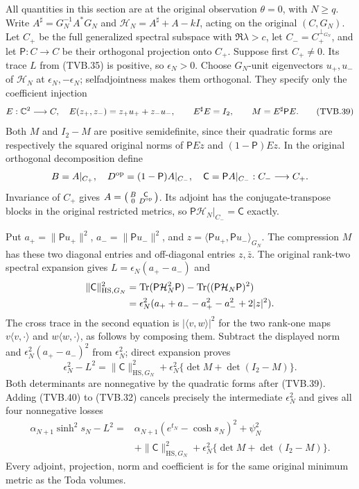 All quantities in this section are at the original observation
$\theta=0$, with $N\ge q$. Write
$A^\sharp=G_N^{-1}A^*G_N$ and
$\mathcal H_N=A^\sharp+A-kI$, acting on the original $(C,G_N)$.
Let $C_+$ be the full generalized spectral subspace with
$\Re\lambda>c$, let $C_-=C_+^{\perp_{G_N}}$, and let
$\mathsf P:C\to C$ be their orthogonal projection onto $C_+$.
Suppose first $C_+\ne0$. Its trace $L$ from (TVB.35) is positive,
so $\epsilon_N>0$. Choose $G_N$-unit eigenvectors $u_+,u_-$
of $\mathcal H_N$ at $\epsilon_N,-\epsilon_N$; selfadjointness
makes them orthogonal. They specify only the coefficient injection
\[
 E:\mathbb C^2\longrightarrow C,\quad E(z_+,z_-)=z_+u_++z_-u_-,
 \qquad E^\sharp E=I_2,\qquad M=E^\sharp\mathsf P E.
 \tag{TVB.39}
\]
Both $M$ and $I_2-M$ are positive semidefinite, since their
quadratic forms are respectively the squared original norms of
$\mathsf PEz$ and $(1-\mathsf P)Ez$.
In the original orthogonal decomposition define
\[
 B=A|_{C_+},\quad D^{\rm op}=(1-\mathsf P)A|_{C_-},\quad
 \mathsf C=\mathsf PA|_{C_-}:C_-\longrightarrow C_+.
\]
Invariance of $C_+$ gives
$A=\left(\begin{smallmatrix}B&\mathsf C\\0&D^{\rm op}\end{smallmatrix}\right)$.
Its adjoint has the conjugate-transpose blocks in the original
restricted metrics, so
$\mathsf P\mathcal H_N|_{C_-}=\mathsf C$ exactly.

Put $a_+=\|\mathsf Pu_+\|^2$, $a_-=\|\mathsf Pu_-\|^2$,
and $z=\langle\mathsf Pu_+,\mathsf Pu_-\rangle_{G_N}$.
The compression $M$ has these two diagonal entries and off-diagonal
entries $z,\bar z$. The original rank-two spectral expansion gives
$L=\epsilon_N(a_+-a_-)$ and
\[
 \begin{split}
 \|\mathsf C\|_{\mathrm{HS},G_N}^2
 &=\operatorname{Tr}(\mathsf P\mathcal H_N^2\mathsf P)
                 -\operatorname{Tr}((\mathsf P\mathcal H_N\mathsf P)^2)\\
 &=\epsilon_N^2(a_++a_--a_+^2-a_-^2+2|z|^2).
 \end{split}
\]
The cross trace in the second equation is $|\langle v,w\rangle|^2$
for the two rank-one maps $v\langle v,\cdot\rangle$ and
$w\langle w,\cdot\rangle$, as follows by composing them.
Subtract the displayed norm and $\epsilon_N^2(a_+-a_-)^2$
from $\epsilon_N^2$; direct expansion proves
\[
 \epsilon_N^2-L^2
 =\|\mathsf C\|_{\mathrm{HS},G_N}^2
       +\epsilon_N^2\{\det M+\det(I_2-M)\}.
 \tag{TVB.40}
\]
Both determinants are nonnegative by the quadratic forms after
(TVB.39). Adding (TVB.40) to (TVB.32) cancels precisely the
intermediate $\epsilon_N^2$ and gives all four nonnegative losses
\[
 \boxed{\begin{aligned}
 \alpha_{N+1}\sinh^2s_N-L^2
 ={}&\alpha_{N+1}(e^{t_N}-\cosh s_N)^2+\psi_N^2\\
 &+\|\mathsf C\|_{\mathrm{HS},G_N}^2
       +\epsilon_N^2\{\det M+\det(I_2-M)\}.
 \end{aligned}}
 \tag{TVB.41}
\]
Every adjoint, projection, norm and coefficient is for the same
original minimum metric as the Toda volumes.

